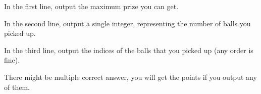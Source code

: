 In the first line, output the maximum prize you can get.

In the second line, output a single integer, representing the number of balls you picked up.

In the third line, output the indices of the balls that you picked up (any order is fine).

There might be multiple correct answer, you will get the points if you output any of them.
